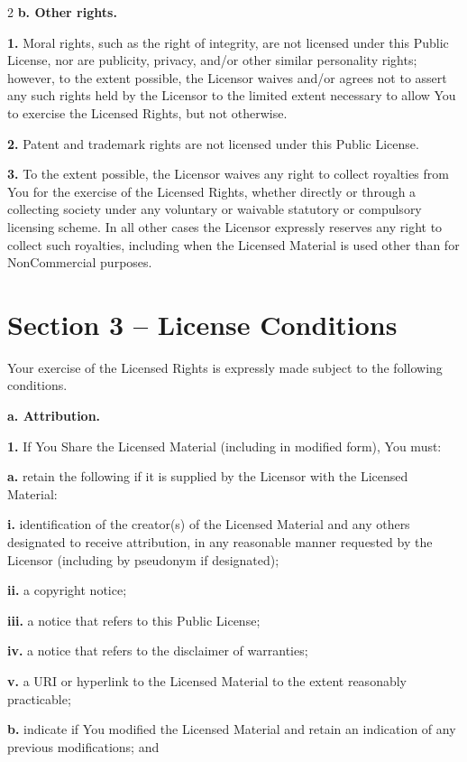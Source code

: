 \begin{multicols*}{2}
    \textbf{b. Other rights.}

    \textbf{1.} Moral rights, such as the right of integrity, are not licensed
    under this Public License, nor are publicity, privacy, and/or other
    similar personality rights; however, to the extent possible, the
    Licensor waives and/or agrees not to assert any such rights held by the
    Licensor to the limited extent necessary to allow You to exercise the
    Licensed Rights, but not otherwise.

    \textbf{2.} Patent and trademark rights are not licensed under this Public
    License.

    \textbf{3.} To the extent possible, the Licensor waives any right to collect
    royalties from You for the exercise of the Licensed Rights, whether
    directly or through a collecting society under any voluntary or
    waivable statutory or compulsory licensing scheme. In all other cases
    the Licensor expressly reserves any right to collect such royalties,
    including when the Licensed Material is used other than for
    NonCommercial purposes.


    \section*{Section 3 -- License Conditions}

    Your exercise of the Licensed Rights is expressly made subject to the
    following conditions.

    \textbf{a. Attribution.}

    \textbf{1.} If You Share the Licensed Material (including in modified form),
    You must:

    \textbf{a.} retain the following if it is supplied by the Licensor with the
    Licensed Material:

    \textbf{i.} identification of the creator(s) of the Licensed Material and any
    others designated to receive attribution, in any reasonable manner
    requested by the Licensor (including by pseudonym if designated);

    \textbf{ii.} a copyright notice;

    \textbf{iii.} a notice that refers to this Public License;

    \textbf{iv.} a notice that refers to the disclaimer of warranties;

    \textbf{v.} a URI or hyperlink to the Licensed Material to the extent
    reasonably practicable;

    \textbf{b.} indicate if You modified the Licensed Material and retain an
    indication of any previous modifications; and


\end{multicols*}
